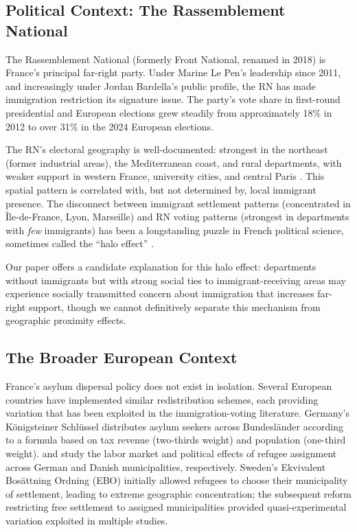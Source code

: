 \documentclass[12pt]{article}
\begin{document}
\subsection{Political Context: The Rassemblement National}

The Rassemblement National (formerly Front National, renamed in 2018) is France's principal far-right party. Under Marine Le Pen's leadership since 2011, and increasingly under Jordan Bardella's public profile, the RN has made immigration restriction its signature issue. The party's vote share in first-round presidential and European elections grew steadily from approximately 18\% in 2012 to over 31\% in the 2024 European elections.

The RN's electoral geography is well-documented: strongest in the northeast (former industrial areas), the Mediterranean coast, and rural departments, with weaker support in western France, university cities, and central Paris \citep{perrineau2017vote}. This spatial pattern is correlated with, but not determined by, local immigrant presence. The disconnect between immigrant settlement patterns (concentrated in \^Ile-de-France, Lyon, Marseille) and RN voting patterns (strongest in departments with \textit{few} immigrants) has been a longstanding puzzle in French political science, sometimes called the ``halo effect'' \citep{etchegaray2019explaining}.

Our paper offers a candidate explanation for this halo effect: departments without immigrants but with strong social ties to immigrant-receiving areas may experience socially transmitted concern about immigration that increases far-right support, though we cannot definitively separate this mechanism from geographic proximity effects.

\subsection{The Broader European Context}

France's asylum dispersal policy does not exist in isolation. Several European countries have implemented similar redistribution schemes, each providing variation that has been exploited in the immigration-voting literature. Germany's K\"onigsteiner Schl\"ussel distributes asylum seekers across Bundesl\"ander according to a formula based on tax revenue (two-thirds weight) and population (one-third weight). \citet{dustmann2019refugee} and \citet{peri2016economic} study the labor market and political effects of refugee assignment across German and Danish municipalities, respectively. Sweden's Ekvivalent Bosättning Ordning (EBO) initially allowed refugees to choose their municipality of settlement, leading to extreme geographic concentration; the subsequent reform restricting free settlement to assigned municipalities provided quasi-experimental variation exploited in multiple studies.
\end{document}
